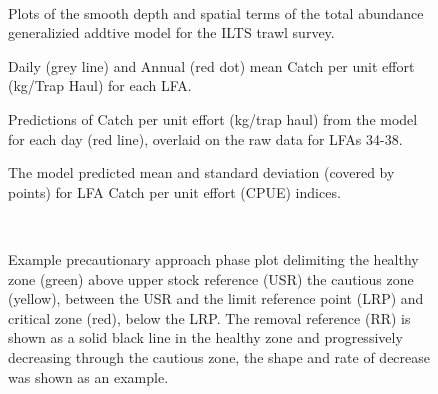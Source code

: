 \documentclass[11pt]{article}
\newcommand{\e}{\string~/bio.data/bio.lobster/figures/LFA3438Framework2019/} %
\begin{document}
 \begin{figure}
    \centering
        \\
        \caption{Plots of the smooth depth and spatial terms of the total abundance generalizied addtive model for the ILTS trawl survey.}

    \end{figure}



  \begin{figure}
    \centering
        \caption{Daily (grey line) and Annual (red dot) mean Catch per unit effort (kg/Trap Haul) for each LFA.}

    \end{figure}



    \begin{figure}
    \centering
        \caption{Predictions of Catch per unit effort (kg/trap haul) from the model for each day (red line), overlaid on the raw data for LFAs 34-38. }

    \end{figure}

    \begin{figure}
    \centering
            \caption{The model predicted mean and standard deviation (covered by points) for LFA Catch per unit effort (CPUE) indices. }

  \end{figure}





\begin{figure}

   \\
                     \caption{Example precautionary approach phase plot delimiting the healthy zone (green) above upper stock reference (USR) the cautious zone (yellow), between the USR and the limit reference point (LRP) and critical zone (red), below the LRP. The removal reference (RR) is shown as a solid black line in the healthy zone and progressively decreasing through the cautious zone, the shape and rate of decrease was shown as an example.}
\end{figure}
\end{document}
